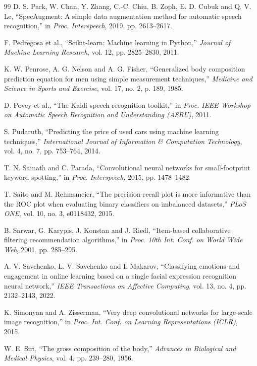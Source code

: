 \documentclass[11pt,letterpaper]{article}
\begin{document}
\begin{thebibliography}{99}
 D. S. Park, W. Chan, Y. Zhang, C.-C. Chiu, B. Zoph, E. D. Cubuk and Q. V. Le, ``SpecAugment: A simple data augmentation method for automatic speech recognition,'' in \emph{Proc. Interspeech}, 2019, pp. 2613--2617.

 F. Pedregosa et al., ``Scikit-learn: Machine learning in Python,'' \emph{Journal of Machine Learning Research}, vol. 12, pp. 2825--2830, 2011.

 K. W. Penrose, A. G. Nelson and A. G. Fisher, ``Generalized body composition prediction equation for men using simple measurement techniques,'' \emph{Medicine and Science in Sports and Exercise}, vol. 17, no. 2, p. 189, 1985.

 D. Povey et al., ``The Kaldi speech recognition toolkit,'' in \emph{Proc. IEEE Workshop on Automatic Speech Recognition and Understanding (ASRU)}, 2011.

 S. Pudaruth, ``Predicting the price of used cars using machine learning techniques,'' \emph{International Journal of Information \& Computation Technology}, vol. 4, no. 7, pp. 753--764, 2014.

 T. N. Sainath and C. Parada, ``Convolutional neural networks for small-footprint keyword spotting,'' in \emph{Proc. Interspeech}, 2015, pp. 1478--1482.

 T. Saito and M. Rehmsmeier, ``The precision-recall plot is more informative than the ROC plot when evaluating binary classifiers on imbalanced datasets,'' \emph{PLoS ONE}, vol. 10, no. 3, e0118432, 2015.

 B. Sarwar, G. Karypis, J. Konstan and J. Riedl, ``Item-based collaborative filtering recommendation algorithms,'' in \emph{Proc. 10th Int. Conf. on World Wide Web}, 2001, pp. 285--295.

 A. V. Savchenko, L. V. Savchenko and I. Makarov, ``Classifying emotions and engagement in online learning based on a single facial expression recognition neural network,'' \emph{IEEE Transactions on Affective Computing}, vol. 13, no. 4, pp. 2132--2143, 2022.

 K. Simonyan and A. Zisserman, ``Very deep convolutional networks for large-scale image recognition,'' in \emph{Proc. Int. Conf. on Learning Representations (ICLR)}, 2015.

 W. E. Siri, ``The gross composition of the body,'' \emph{Advances in Biological and Medical Physics}, vol. 4, pp. 239--280, 1956.


\end{thebibliography}
\end{document}
